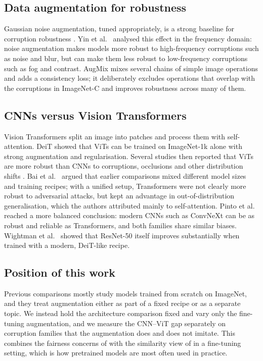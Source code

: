\documentclass[a4paper,11pt]{article}
\begin{document}
\subsection{Data augmentation for robustness}
Gaussian noise augmentation, tuned appropriately, is a strong baseline for corruption robustness \cite{rusak2020simple}. Yin et al.\ \cite{yin2019fourier} analysed this effect in the frequency domain: noise augmentation makes models more robust to high-frequency corruptions such as noise and blur, but can make them less robust to low-frequency corruptions such as fog and contrast. AugMix \cite{hendrycks2020augmix} mixes several chains of simple image operations and adds a consistency loss; it deliberately excludes operations that overlap with the corruptions in ImageNet-C and improves robustness across many of them.

\subsection{CNNs versus Vision Transformers}
Vision Transformers \cite{dosovitskiy2021image} split an image into patches and process them with self-attention. DeiT \cite{touvron2021training} showed that ViTs can be trained on ImageNet-1k alone with strong augmentation and regularisation. Several studies then reported that ViTs are more robust than CNNs to corruptions, occlusions and other distribution shifts \cite{bhojanapalli2021understanding,paul2022vision,naseer2021intriguing}. Bai et al.\ \cite{bai2021transformers} argued that earlier comparisons mixed different model sizes and training recipes; with a unified setup, Transformers were not clearly more robust to adversarial attacks, but kept an advantage in out-of-distribution generalisation, which the authors attributed mainly to self-attention. Pinto et al.\ \cite{pinto2022impartial} reached a more balanced conclusion: modern CNNs such as ConvNeXt \cite{liu2022convnet} can be as robust and reliable as Transformers, and both families share similar biases. Wightman et al.\ \cite{wightman2021resnet} showed that ResNet-50 itself improves substantially when trained with a modern, DeiT-like recipe.

\subsection{Position of this work}
Previous comparisons mostly study models trained from scratch on ImageNet, and they treat augmentation either as part of a fixed recipe or as a separate topic. We instead hold the architecture comparison fixed and vary only the fine-tuning augmentation, and we measure the CNN--ViT gap separately on corruption families that the augmentation does and does not imitate. This combines the fairness concerns of \cite{bai2021transformers,pinto2022impartial} with the similarity view of \cite{mintun2021interaction} in a fine-tuning setting, which is how pretrained models are most often used in practice.
\end{document}
